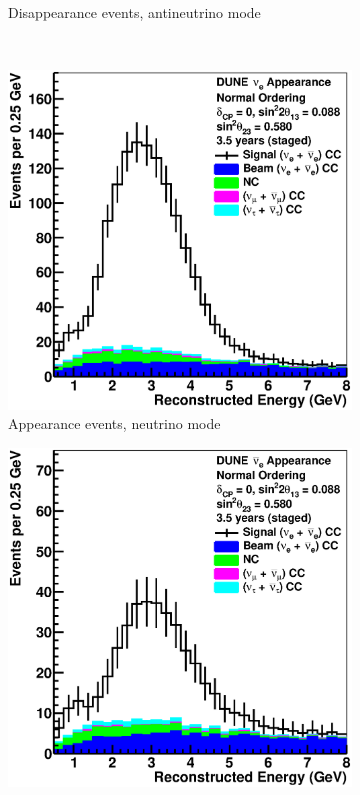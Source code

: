 \begin{figure}[h]
\begin{subfigure}[t]{.49\textwidth}
    \caption{Disappearance events, antineutrino mode}
  \end{subfigure}
  \\
  \centering
  \begin{subfigure}[t]{.49\textwidth}
    \includegraphics[width=\linewidth]{files/figures/dune_detector/spec_app_nu_no}
    \caption{Appearance events, neutrino mode}
  \end{subfigure}
  \hfill
  \begin{subfigure}[t]{.49\textwidth}
    \includegraphics[width=\linewidth]{files/figures/dune_detector/spec_app_anu_no}

\end{subfigure}
\end{figure}
